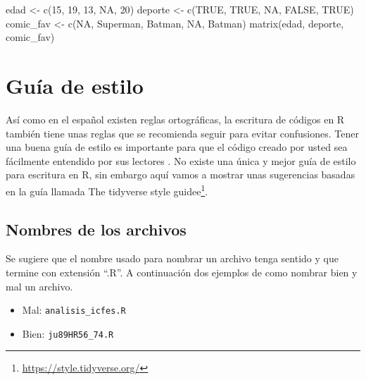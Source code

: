 \documentclass[
]{book}
\makeatletter
\newenvironment{Shaded}{\begin{snugshade}}{\end{snugshade}}
\newcommand{\ConstantTok}[1]{\textcolor[rgb]{0.00,0.00,0.00}{#1}}
\newcommand{\DecValTok}[1]{\textcolor[rgb]{0.00,0.00,0.81}{#1}}
\newcommand{\FunctionTok}[1]{\textcolor[rgb]{0.00,0.00,0.00}{#1}}
\newcommand{\NormalTok}[1]{#1}
\newcommand{\OtherTok}[1]{\textcolor[rgb]{0.56,0.35,0.01}{#1}}
\newcommand{\StringTok}[1]{\textcolor[rgb]{0.31,0.60,0.02}{#1}}
\providecommand{\tightlist}{%
  \setlength{\itemsep}{0pt}\setlength{\parskip}{0pt}}
\renewcommand{\href}[2]{#2\footnote{\url{#1}}}
\newenvironment{kframe}{%
\medskip{}
\setlength{\fboxsep}{.8em}
 \def\at@end@of@kframe{}%
 \ifinner\ifhmode%
  \def\at@end@of@kframe{\end{minipage}}%
  \begin{minipage}{\columnwidth}%
 \fi\fi%
 \def\FrameCommand##1{\hskip\@totalleftmargin \hskip-\fboxsep
 \colorbox{shadecolor}{##1}\hskip-\fboxsep
     \hskip-\linewidth \hskip-\@totalleftmargin \hskip\columnwidth}%
 \MakeFramed {\advance\hsize-\width
   \@totalleftmargin\z@ \linewidth\hsize
   \@setminipage}}%
 {\par\unskip\endMakeFramed%
 \at@end@of@kframe}
\renewenvironment{Shaded}{\begin{kframe}}{\end{kframe}}
\makeatother
\begin{document}
\begin{Shaded}
\begin{Highlighting}[]
\NormalTok{edad }\OtherTok{\textless{}{-}} \FunctionTok{c}\NormalTok{(}\DecValTok{15}\NormalTok{, }\DecValTok{19}\NormalTok{, }\DecValTok{13}\NormalTok{, }\ConstantTok{NA}\NormalTok{, }\DecValTok{20}\NormalTok{)}
\NormalTok{deporte }\OtherTok{\textless{}{-}} \FunctionTok{c}\NormalTok{(}\ConstantTok{TRUE}\NormalTok{, }\ConstantTok{TRUE}\NormalTok{, }\ConstantTok{NA}\NormalTok{, }\ConstantTok{FALSE}\NormalTok{, }\ConstantTok{TRUE}\NormalTok{)}
\NormalTok{comic\_fav }\OtherTok{\textless{}{-}} \FunctionTok{c}\NormalTok{(}\ConstantTok{NA}\NormalTok{, }\StringTok{\textquotesingle{}Superman\textquotesingle{}}\NormalTok{, }\StringTok{\textquotesingle{}Batman\textquotesingle{}}\NormalTok{, }\ConstantTok{NA}\NormalTok{, }\StringTok{\textquotesingle{}Batman\textquotesingle{}}\NormalTok{)}
\FunctionTok{matrix}\NormalTok{(edad, deporte, comic\_fav)}
\end{Highlighting}
\end{Shaded}

\hypertarget{estilo}{%
\chapter{Guía de estilo}\label{estilo}}

Así como en el español existen reglas ortográficas, la escritura de códigos en R también tiene unas reglas que se recomienda seguir para evitar confusiones. Tener una buena guía de estilo es importante para que el código creado por usted sea fácilmente entendido por sus lectores \citep{rpackages}. No existe una única y mejor guía de estilo para escritura en R, sin embargo aquí vamos a mostrar unas sugerencias basadas en la guía llamada \href{https://style.tidyverse.org/}{The tidyverse style guidee}.

\hypertarget{nombres-de-los-archivos}{%
\section{Nombres de los archivos}\label{nombres-de-los-archivos}}

Se sugiere que el nombre usado para nombrar un archivo tenga sentido y que termine con extensión ``.R''. A continuación dos ejemplos de como nombrar bien y mal un archivo.

\begin{itemize}
\tightlist
\item
  Mal: \texttt{analisis\_icfes.R}
\item
  Bien: \texttt{ju89HR56\_74.R}
\end{itemize}
\end{document}
